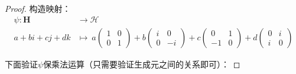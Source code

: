 \documentclass[12pt, a4paper, oneside]{ctexart}
\begin{document}
\begin{proof}
    构造映射：
    \begin{equation*}
        \begin{aligned}
            \psi:\mathbf{H}&\rightarrow \mathcal{H} \\
            a+bi+cj+dk&\mapsto 
            \ a\begin{pmatrix}
                1&0\\0&1
            \end{pmatrix}
            +b\begin{pmatrix}
                i&0\\0&-i
            \end{pmatrix}
            +c\begin{pmatrix}
                0&1\\-1&0
            \end{pmatrix}
            +d\begin{pmatrix}
                0&i\\i&0
            \end{pmatrix}
        \end{aligned}
    \end{equation*}

    下面验证$\psi$保乘法运算（只需要验证生成元之间的关系即可）：


\end{proof}
\end{document}
